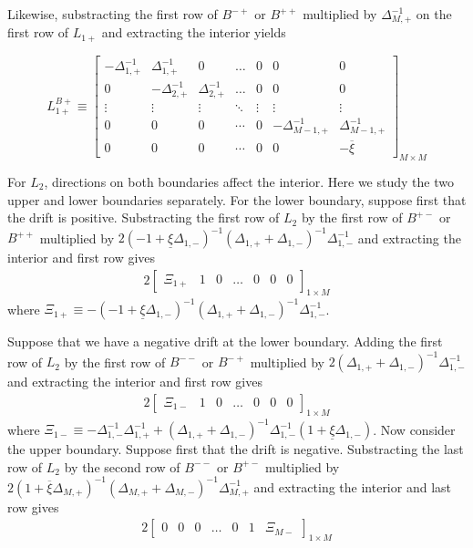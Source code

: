 \documentclass[11pt]{article}
\theoremstyle{definition}
\begin{document}
Likewise, substracting the first row of $B^{-+}$ or $B^{++}$ multiplied by $\Delta_{M,+}^{-1}$ on the first row of $L_{1+}$ and extracting the interior yields

\begin{equation}
L_{1+}^{B+} \equiv \begin{bmatrix}
-\Delta_{1,+}^{-1}&\Delta_{1,+}^{-1}&0&\dots&0&0&0\\
0&-\Delta_{2,+}^{-1}&\Delta_{2,+}^{-1}&\dots&0&0&0\\
\vdots&\vdots&\vdots&\ddots&\vdots&\vdots&\vdots\\
0&0&0&\cdots&0&-\Delta_{M-1,+}^{-1}&\Delta_{M-1,+}^{-1}\\
0&0&0&\cdots&0&0&-\overline{\xi} 
\end{bmatrix}_{M\times M} \label{eq:L-1p-irregular-right}
\end{equation}

For $L_2$, directions on both boundaries affect the interior. Here we study the two upper and lower boundaries separately. For the lower boundary, suppose first that the drift is positive. Substracting the first row of $L_2$ by the first row of $B^{+-}$ or $B^{++}$ multiplied by $2(-1 + \underline{\xi} \Delta_{1,-} )^{-1} (\Delta_{1,+} + \Delta_{1,-})^{-1}  \Delta_{1,-}^{-1} $  and extracting the interior and first row gives
\begin{align}
2\begin{bmatrix}
\Xi_{1+} &1&0&\dots&0&0&0
\end{bmatrix}_{1\times M}
\end{align}
where $\Xi_{1+} \equiv  - (-1 + \underline{\xi} \Delta_{1,-})^{-1} (\Delta_{1,+} + \Delta_{1,-})^{-1}  \Delta_{1,-}^{-1}$.

Suppose that we have a negative drift at the lower boundary. Adding the first row of $L_2$ by the first row of $B^{--}$ or $B^{-+}$ multiplied by $2(\Delta_{1,+} + \Delta_{1,-} )^{-1} \Delta_{1,-}^{-1}$ and extracting the interior and first row gives
\begin{align}
2\begin{bmatrix}
\Xi_{1-} &1&0&\dots&0&0&0
\end{bmatrix}_{1\times M}
\end{align}
where $\Xi_{1-} \equiv -\Delta_{1,-}^{-1} \Delta_{1,+}^{-1}  + (\Delta_{1,+} + \Delta_{1,-} )^{-1} \Delta_{1,-}^{-1} (1 + \underline{\xi}\Delta_{1,-})$.
Now consider the upper boundary. Suppose first that the drift is negative. Substracting the last row of $L_2$ by the second row of $B^{--}$ or $B^{+-}$ multiplied by $2(1 + \overline{\xi} \Delta_{M,+} )^{-1} (\Delta_{M,+} + \Delta_{M,-})^{-1}  \Delta_{M,+}^{-1}$ and extracting the interior and last row gives 
\begin{align}
2\begin{bmatrix}
0 &0&0&\dots&0&1&\Xi_{M-}
\end{bmatrix}_{1\times M}
\end{align}
\end{document}
